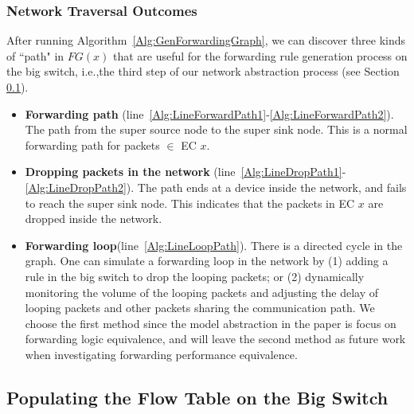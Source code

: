 \subsubsection{Network Traversal Outcomes}
After running Algorithm~\ref{Alg:GenForwardingGraph}, we can discover three kinds of ``path" in $FG(x)$ that are useful for the forwarding rule generation process on the big switch, i.e.,the third step of our network abstraction process (see Section \ref{sec:thirdstep}). 

\begin{itemize}
\item \textbf{Forwarding path} (line~\ref{Alg:LineForwardPath1}-\ref{Alg:LineForwardPath2}).
        The path from the super source node to the super sink node.
        This is a normal forwarding path for packets $\in$ EC $x$.
        
\item \textbf{Dropping packets in the network} (line~\ref{Alg:LineDropPath1}-\ref{Alg:LineDropPath2}).
        The path ends at a device inside the network, and fails to reach the super sink node. This indicates that the packets in EC $x$ are dropped inside the network.
        
\item \textbf{Forwarding loop}(line~\ref{Alg:LineLoopPath}).
        There is a directed cycle in the graph. One can simulate a forwarding loop in the network by (1) adding a rule in the big switch to drop the looping packets; or (2) dynamically monitoring the volume of the looping packets and adjusting the delay of looping packets and other packets sharing the communication path. We choose the first method since the model abstraction in the paper is focus on forwarding logic equivalence, and will leave the second method as future work when investigating forwarding performance equivalence. 
\end{itemize}

\subsection{Populating the Flow Table on the Big Switch}\label{sec:thirdstep}

